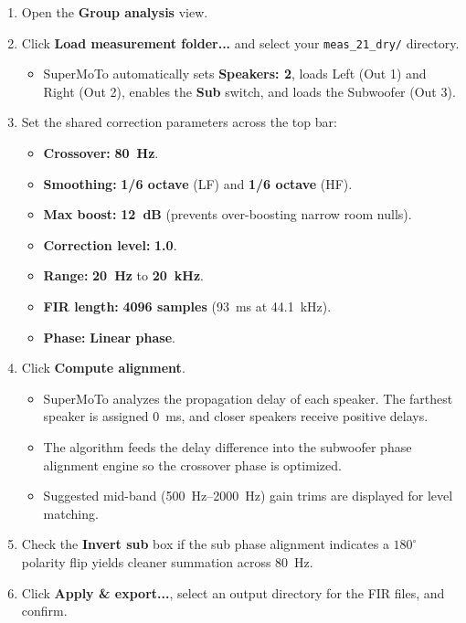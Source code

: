 \documentclass[11pt,a4paper]{article}
\begin{document}
\begin{enumerate}
  \item Open the \textbf{Group analysis} view.
  \item Click \textbf{Load measurement folder...} and select your \texttt{meas\_21\_dry/} directory.
    \begin{itemize}[nosep]
      \item SuperMoTo automatically sets \textbf{Speakers: 2}, loads Left (Out 1) and Right (Out 2), enables the \textbf{Sub} switch, and loads the Subwoofer (Out 3).
    \end{itemize}
  \item Set the shared correction parameters across the top bar:
    \begin{itemize}[nosep]
      \item \textbf{Crossover:} \textbf{\SI{80}{\hertz}}.
      \item \textbf{Smoothing:} \textbf{1/6 octave} (LF) and \textbf{1/6 octave} (HF).
      \item \textbf{Max boost:} \textbf{\SI{12}{\dB}} (prevents over-boosting narrow room nulls).
      \item \textbf{Correction level:} \textbf{1.0}.
      \item \textbf{Range:} \textbf{\SI{20}{\hertz}} to \textbf{\SI{20}{\kilo\hertz}}.
      \item \textbf{FIR length:} \textbf{4096 samples} (\SI{93}{\ms} at \SI{44.1}{\kHz}).
      \item \textbf{Phase:} \textbf{Linear phase}.
    \end{itemize}
  \item Click \textbf{Compute alignment}.
    \begin{itemize}[nosep]
      \item SuperMoTo analyzes the propagation delay of each speaker. The farthest speaker is assigned \SI{0}{\ms}, and closer speakers receive positive delays.
      \item The algorithm feeds the delay difference into the subwoofer phase alignment engine so the crossover phase is optimized.
      \item Suggested mid-band (\SIrange{500}{2000}{\hertz}) gain trims are displayed for level matching.
    \end{itemize}
  \item Check the \textbf{Invert sub} box if the sub phase alignment indicates a $180^\circ$ polarity flip yields cleaner summation across \SI{80}{\hertz}.
  \item Click \textbf{Apply \& export...}, select an output directory for the FIR files, and confirm.
\end{enumerate}
\end{document}
